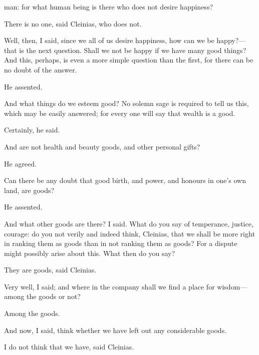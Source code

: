 \documentclass[11pt,letter]{article}
\begin{document}
man: for what human being is there who does not desire happiness?

\par  There is no one, said Cleinias, who does not.

\par  Well, then, I said, since we all of us desire happiness, how can we be happy?—that is the next question. Shall we not be happy if we have many good things? And this, perhaps, is even a more simple question than the first, for there can be no doubt of the answer.

\par  He assented.

\par  And what things do we esteem good? No solemn sage is required to tell us this, which may be easily answered; for every one will say that wealth is a good.

\par  Certainly, he said.

\par  And are not health and beauty goods, and other personal gifts?

\par  He agreed.

\par  Can there be any doubt that good birth, and power, and honours in one's own land, are goods?

\par  He assented.

\par  And what other goods are there? I said. What do you say of temperance, justice, courage: do you not verily and indeed think, Cleinias, that we shall be more right in ranking them as goods than in not ranking them as goods? For a dispute might possibly arise about this. What then do you say?

\par  They are goods, said Cleinias.

\par  Very well, I said; and where in the company shall we find a place for wisdom—among the goods or not?

\par  Among the goods.

\par  And now, I said, think whether we have left out any considerable goods.

\par  I do not think that we have, said Cleinias.
\end{document}
